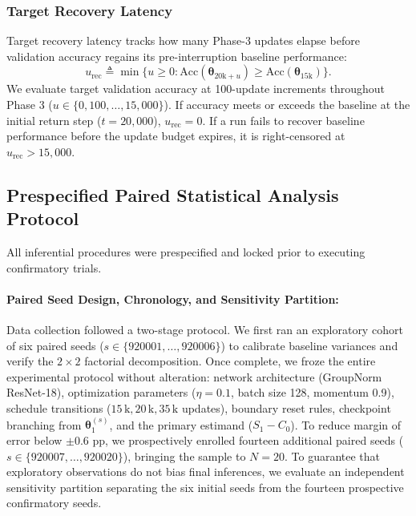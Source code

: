 \documentclass[sn-mathphys,Numbered]{sn-jnl}
\newcommand{\urec}{u_{\mathrm{rec}}}
\begin{document}
\subsubsection{Target Recovery Latency}\label{subsubsec:protocol_urec}
Target recovery latency tracks how many Phase-3 updates elapse before validation accuracy regains its pre-interruption baseline performance:
\begin{equation}\label{eq:urec}
    \urec \triangleq \min \{ u \ge 0 : \mathrm{Acc}(\bm{\theta}_{20\mathrm{k} + u}) \ge \mathrm{Acc}(\bm{\theta}_{15\mathrm{k}}) \}.
\end{equation}
We evaluate target validation accuracy at 100-update increments throughout Phase 3 ($u \in \{0, 100, \dots, 15{,}000\}$). If accuracy meets or exceeds the baseline at the initial return step ($t = 20{,}000$), $\urec = 0$. If a run fails to recover baseline performance before the update budget expires, it is right-censored at $\urec > 15{,}000$.

\subsection{Prespecified Paired Statistical Analysis Protocol}\label{subsec:protocol_statistics}

All inferential procedures were prespecified and locked prior to executing confirmatory trials.

\paragraph{Paired Seed Design, Chronology, and Sensitivity Partition:}
Data collection followed a two-stage protocol. We first ran an exploratory cohort of six paired seeds ($s \in \{920001, \dots, 920006\}$) to calibrate baseline variances and verify the $2 \times 2$ factorial decomposition. Once complete, we froze the entire experimental protocol without alteration: network architecture (GroupNorm ResNet-18), optimization parameters ($\eta = 0.1$, batch size 128, momentum 0.9), schedule transitions ($15\,\mathrm{k}, 20\,\mathrm{k}, 35\,\mathrm{k}$ updates), boundary reset rules, checkpoint branching from $\bm{\theta}_1^{(s)}$, and the primary estimand ($S_1 - C_0$). To reduce margin of error below $\pm 0.6$ pp, we prospectively enrolled fourteen additional paired seeds ($s \in \{920007, \dots, 920020\}$), bringing the sample to $N = 20$. To guarantee that exploratory observations do not bias final inferences, we evaluate an independent sensitivity partition separating the six initial seeds from the fourteen prospective confirmatory seeds.
\end{document}
